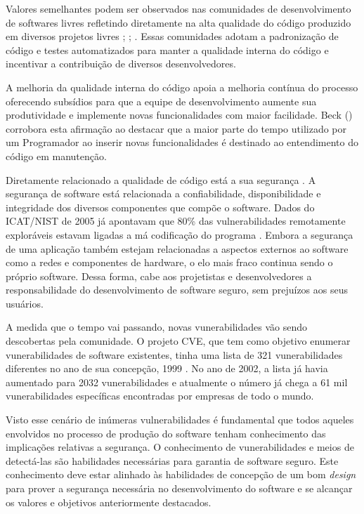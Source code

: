 %

Valores semelhantes podem ser observados nas comunidades de desenvolvimento de softwares livres refletindo diretamente na alta qualidade do código produzido em diversos projetos livres \cite{schmidt2001}; \cite{halloran2002}; \cite{michlmayr2003}. Essas comunidades adotam a padronização de código e testes automatizados para manter a qualidade interna do código e incentivar a contribuição de diversos desenvolvedores.

%

A melhoria da qualidade interna do código apoia a melhoria contínua do processo oferecendo subsídios para que a equipe de desenvolvimento aumente sua produtividade e implemente novas funcionalidades com maior facilidade. Beck (\citeyear{beck2007}) corrobora esta afirmação ao destacar que a maior parte do tempo utilizado por um Programador ao inserir novas funcionalidades é destinado ao entendimento do código em manutenção. 

%

Diretamente relacionado a qualidade de código está a sua segurança \cite{tsipenyuk2005}. A segurança de software está relacionada a confiabilidade, disponibilidade e integridade dos diversos componentes que compõe o software. Dados do ICAT/NIST de 2005 já apontavam que 80\% das vulnerabilidades remotamente exploráveis estavam ligadas a má codificação do programa \cite{duarte2005}. Embora a segurança de uma aplicação também estejam relacionadas a aspectos externos ao software como a redes e componentes de hardware, o elo mais fraco continua sendo o próprio software. Dessa forma, cabe aos projetistas e desenvolvedores a responsabilidade do desenvolvimento de software seguro, sem prejuízos aos seus usuários.

%

A medida que o tempo vai passando, novas vunerabilidades vão sendo descobertas pela comunidade. O projeto CVE, que tem como objetivo enumerar vunerabilidades de software existentes, tinha uma lista de 321 vunerabilidades diferentes no ano de sua concepção, 1999 \cite{cve2002}. No ano de 2002, a lista já havia aumentado para 2032 vunerabilidades e atualmente o número já chega a 61 mil vunerabilidades específicas encontradas por empresas de todo o mundo.

%

Visto esse cenário de inúmeras vulnerabilidades é fundamental que todos aqueles envolvidos no processo de produção do software tenham conhecimento das implicações relativas a segurança. O conhecimento de vunerabilidades e meios de detectá-las são habilidades necessárias para garantia de software seguro. Este conhecimento deve estar alinhado às habilidades de concepção de um bom \emph{design} para prover a segurança necessária no desenvolvimento do software e se alcançar os valores e objetivos anteriormente destacados.

